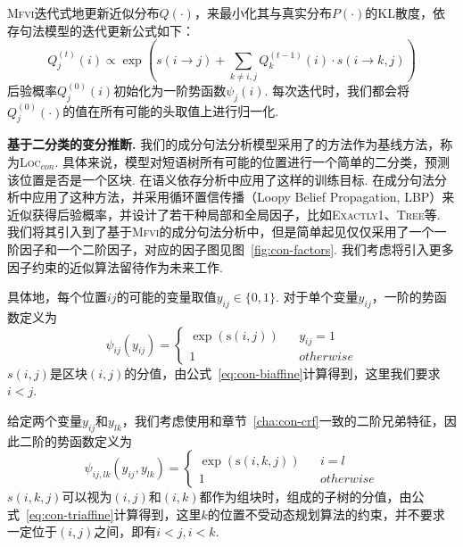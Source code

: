 \textsc{Mfvi}迭代式地更新近似分布$Q(\cdot)$，来最小化其与真实分布$P(\cdot)$的KL散度，依存句法模型的迭代更新公式如下\citep{wang-tu-2020-second}：
\begin{equation}
  \label{eq:mfvi-dep}
  Q_{j}^{(t)}(i)\propto \exp\left(s(i\rightarrow j) +\sum_{k\neq i,j} Q_{k}^{(t-1)}(i)\cdot s(i\rightarrow {k,j}) \right)
\end{equation}
后验概率$Q_j^{(0)}(i)$初始化为一阶势函数$\psi_j(i)$.
每次迭代时，我们都会将$Q_j^{(0)}(\cdot)$的值在所有可能的头取值上进行归一化.

\noindent\textbf{基于二分类的变分推断.}
我们的成分句法分析模型采用了\citep{gaddy-etal-2018-whats}的方法作为基线方法，称为\textsc{Loc}$_{con}$.
具体来说，模型对短语树所有可能的位置进行一个简单的二分类，预测该位置是否是一个区块.
\citep{dozat-manning-2018-simpler,wang-etal-2019-second}在语义依存分析中应用了这样的训练目标.
\citep{gormley-eisner-2015-structured,naradowsky-etal-2012-grammarless}在成分句法分析中应用了这种方法，并采用循环置信传播（Loopy Belief Propagation, LBP）来近似获得后验概率，并设计了若干种局部和全局因子，比如\textsc{Exactly1}、\textsc{Tree}等.
我们将其引入到了基于\textsc{Mfvi}的成分句法分析中，但是简单起见仅仅采用了一个一阶因子和一个二阶因子，对应的因子图见图~\ref{fig:con-factors}.
我们考虑将引入更多因子约束的近似算法留待作为未来工作.


具体地，每个位置$ij$的可能的变量取值$y_{ij}\in \{0,1\}$. 对于单个变量$y_{ij}$，一阶的势函数定义为
\begin{equation}
  \label{eq:con-1o-potential}
  \psi_{ij}(y_{ij})=\left\{
  \begin{array}{rcl}
    \exp\left(\mathrm{s}(i,j)\right) &  & {y_{ij}=1}  \\
    1                                &  & {otherwise}
  \end{array}
  \right.
\end{equation}
$s(i,j)$是区块$(i,j)$的分值，由公式~\ref{eq:con-biaffine}计算得到，这里我们要求$i<j$.

给定两个变量$y_{ij}$和$y_{lk}$，我们考虑使用和章节~\ref{cha:con-crf}一致的二阶兄弟特征，因此二阶的势函数定义为
\begin{equation}
  \label{eq:2o-con-potential}
  \psi_{ij,lk}(y_{ij},y_{lk})=\left\{
  \begin{array}{rcl}
    \exp\left(\mathrm{s}(i,k,j)\right) &  & {i=l}       \\
    1                                  &  & {otherwise}
  \end{array}
  \right.
\end{equation}
$s(i,k,j)$可以视为$(i,j)$和$(i,k)$都作为组块时，组成的子树的分值，由公式~\ref{eq:con-triaffine}计算得到，这里$k$的位置不受动态规划算法的约束，并不要求一定位于$(i,j)$之间，即有$i<j,i<k$.

